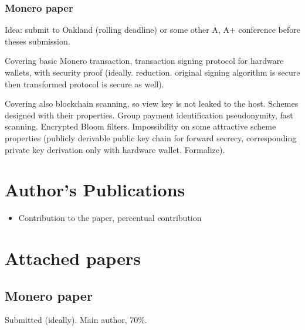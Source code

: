 \documentclass[
  digital, %
  twoside, %
  table,   %
  lof,     %
  lot,     %
]{fithesis3}
\theoremstyle{definition}
\theoremstyle{remark}
\begin{document}
\newpage
\subsection{Monero paper}

Idea: submit to Oakland (rolling deadline) or some other A, A+ conference before theses submission. 

Covering basic Monero transaction, transaction signing protocol for hardware wallets, with security proof (ideally. reduction. original signing algorithm is secure then transformed protocol is secure as well).

Covering also blockchain scanning, so view key is not leaked to the host. Schemes designed with their properties. Group payment identification pseudonymity, fast scanning. Encrypted Bloom filters. Impossibility on some attractive scheme properties (publicly derivable public key chain for forward secrecy, corresponding private key derivation only with hardware wallet. Formalize). 


\chapter{Author's Publications}
\begin{shaded}
\begin{itemize}
    \item Contribution to the paper, percentual contribution
\end{itemize}
\end{shaded}




  \printbibliography[heading=bibintoc] 




\appendix 
\chapter{Attached papers}

\section{Monero paper}
Submitted (ideally). Main author, 70\%.
\end{document}
